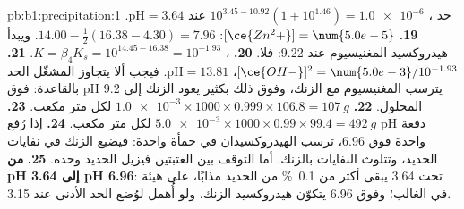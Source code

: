 \begin{solution}{pb:b1:precipitation:1}
حد ، $10^{3.45 - 10.92}(1 + 10^{1.46}) =
\num{1.0e-6}$ عند $\mathrm{pH} = 3.64$.
\textbf{19.} $[\ce{Zn^2+}] = \num{5.0e-5}$: $14.00 - \frac12(16.38 - 4.30) =
7.96$. ويبدأ هيدروكسيد المغنيسيوم عند 9.22: فلا.
\textbf{20.} ، $K = \beta_4 K_s =
10^{14.45 - 16.38} = 10^{-1.93}$.
\textbf{21.} $[\ce{OH-}]^2 = \num{5.0e-3}/10^{-1.93}$، $\mathrm{pH} =
13.81$. فيجب ألا يتجاوز المشغّل الحد بالقاعدة: فوق pH 9.2 يترسب
المغنيسيوم مع الزنك، وفوق ذلك بكثير يعود الزنك
إلى المحلول.
\textbf{22.} $\num{1.0e-3} \times 1000 \times 0.999 \times 106.8 =
\qty{107}{g}$ لكل متر مكعب.
\textbf{23.} $\num{5.0e-3} \times 1000 \times 0.99 \times 99.4 =
\qty{492}{g}$ لكل متر مكعب.
\textbf{24.} إذا رُفع pH دفعة واحدة فوق 6.96، ترسب الهيدروكسيدان في
حمأة واحدة: فيضيع الزنك في نفايات الحديد، وتتلوث النفايات
بالزنك. أما التوقف بين العتبتين فيزيل الحديد
وحده.
\textbf{25.} \textbf{من pH 3.64 إلى pH 6.96}: تحت 3.64 يبقى أكثر من
\qty{0.1}{\percent} من الحديد مذابًا، على هيئة  في الغالب؛ وفوق
6.96 يتكوّن هيدروكسيد الزنك. ولو أُهمل  لوُضع
الحد الأدنى عند 3.15.
\end{solution}

